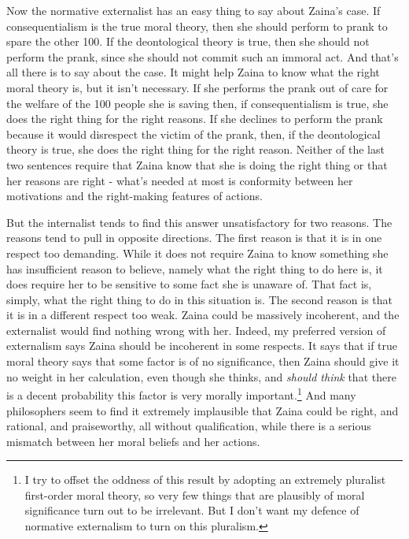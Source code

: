 Now the normative externalist has an easy thing to say about \gls{Zaina}'s case. If consequentialism is the true moral theory, then she should perform to prank to spare the other 100. If the deontological theory is true, then she should not perform the prank, since she should not commit such an immoral act. And that's all there is to say about the case. It might help \gls{Zaina} to know what the right moral theory is, but it isn't necessary. If she performs the prank out of care for the welfare of the 100 people she is saving then, if consequentialism is true, she does the right thing for the right reasons. If she declines to perform the prank because it would disrespect the victim of the prank, then, if the deontological theory is true, she does the right thing for the right reason. Neither of the last two sentences require that \gls{Zaina} know that she is doing the right thing or that her reasons are right - what's needed at most is conformity between her motivations and the right-making features of actions.

But the internalist tends to find this answer unsatisfactory for two reasons. The reasons tend to pull in opposite directions. The first reason is that it is in one respect too demanding. While it does not require \gls{Zaina} to know something she has insufficient reason to believe, namely what the right thing to do here is, it does require her to be sensitive to some fact she is unaware of. That fact is, simply, what the right thing to do in this situation is. The second reason is that it is in a different respect too weak. \gls{Zaina} could be massively incoherent, and the externalist would find nothing wrong with her. Indeed, my preferred version of externalism says \gls{Zaina} should be incoherent in some respects. It says that if true moral theory says that some factor is of no significance, then \gls{Zaina} should give it no weight in her calculation, even though she thinks, and \emph{should think} that there is a decent probability this factor is very morally important.\footnote{I try to offset the oddness of this result by adopting an extremely pluralist first-order moral theory, so very few things that are plausibly of moral significance turn out to be irrelevant. But I don't want my defence of normative externalism to turn on this pluralism.} And many philosophers seem to find it extremely implausible that \gls{Zaina} could be right, and rational, and praiseworthy, all without qualification, while there is a serious mismatch between her moral beliefs and her actions.

